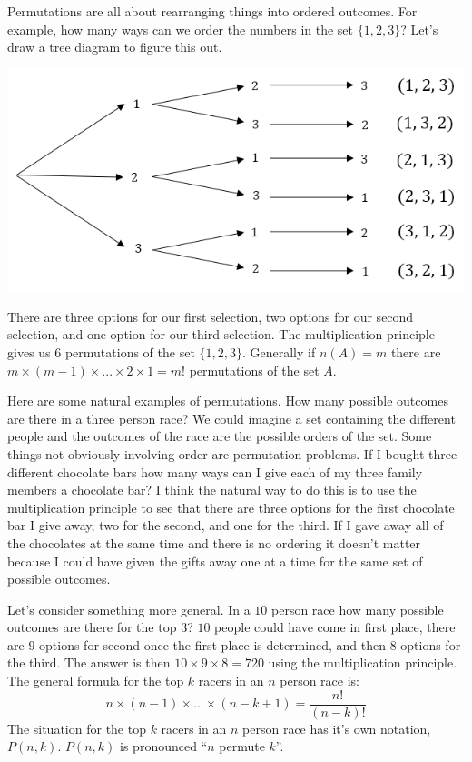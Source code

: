 \documentclass[
]{book}
\begin{document}
Permutations are all about rearranging things into ordered outcomes. For example, how many ways can we order the numbers in the set \(\{1,2,3\}\)? Let's draw a tree diagram to figure this out.

\includegraphics{Pictures/02-Counting/permute3large.PNG}

There are three options for our first selection, two options for our second selection, and one option for our third selection. The multiplication principle gives us 6 permutations of the set \(\{1,2,3\}\). Generally if \(n(A) = m\) there are \(m \times (m-1) \times ... \times 2 \times 1 = m!\) permutations of the set \(A\).

Here are some natural examples of permutations. How many possible outcomes are there in a three person race? We could imagine a set containing the different people and the outcomes of the race are the possible orders of the set. Some things not obviously involving order are permutation problems. If I bought three different chocolate bars how many ways can I give each of my three family members a chocolate bar? I think the natural way to do this is to use the multiplication principle to see that there are three options for the first chocolate bar I give away, two for the second, and one for the third. If I gave away all of the chocolates at the same time and there is no ordering it doesn't matter because I could have given the gifts away one at a time for the same set of possible outcomes.

Let's consider something more general. In a \(10\) person race how many possible outcomes are there for the top \(3\)? \(10\) people could have come in first place, there are \(9\) options for second once the first place is determined, and then \(8\) options for the third. The answer is then \(10 \times 9 \times 8=720\) using the multiplication principle. The general formula for the top \(k\) racers in an \(n\) person race is:
\[n \times (n-1) \times ... \times (n-k+1) = \frac{n!}{(n-k)!}\]
The situation for the top \(k\) racers in an \(n\) person race has it's own notation, \(P(n,k)\). \(P(n,k)\) is pronounced ``\(n\) permute \(k\)''.
\end{document}
